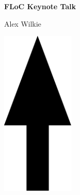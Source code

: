 \documentclass[a3paper]{article}
\begin{document}
\printGenericVSLHeaderBig
\begin{center}
\begin{vsltext}{3cm}{3.5cm}

    \vspace{1.5cm}

    \textbf{FLoC Keynote Talk} 

    Alex Wilkie

    \vspace{2cm}

    \includegraphics[height=8cm,keepaspectratio=true]{arrow_keynote.pdf}

\end{vsltext}

\end{center}
\end{document}
